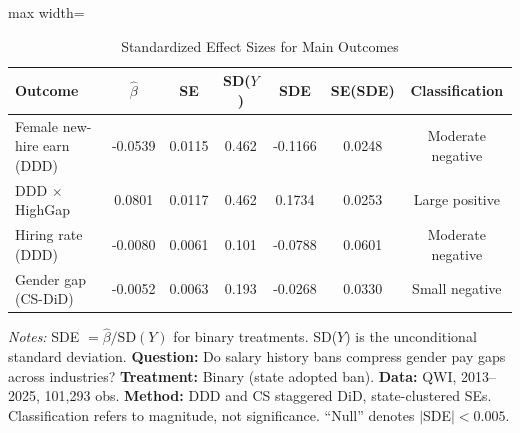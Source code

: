 \begin{table}[H]
\centering
\caption{Standardized Effect Sizes for Main Outcomes}
\label{tab:sde}
\begin{adjustbox}{max width=\textwidth}
\begin{tabular}{lcccccc}
\toprule
Outcome & $\hat{\beta}$ & SE & SD($Y$) & SDE & SE(SDE) & Classification \\
\midrule
Female new-hire earn (DDD) & -0.0539 & 0.0115 & 0.462 & -0.1166 & 0.0248 & Moderate negative \\
DDD $\times$ HighGap & 0.0801 & 0.0117 & 0.462 & 0.1734 & 0.0253 & Large positive \\
Hiring rate (DDD) & -0.0080 & 0.0061 & 0.101 & -0.0788 & 0.0601 & Moderate negative \\
Gender gap (CS-DiD) & -0.0052 & 0.0063 & 0.193 & -0.0268 & 0.0330 & Small negative \\
\bottomrule
\end{tabular}
\end{adjustbox}

\vspace{0.5em}
{\small \emph{Notes:} SDE $= \hat{\beta} / \text{SD}(Y)$ for binary treatments. SD($Y$) is the unconditional standard deviation. \textbf{Question:} Do salary history bans compress gender pay gaps across industries? \textbf{Treatment:} Binary (state adopted ban). \textbf{Data:} QWI, 2013--2025, 101{,}293 obs. \textbf{Method:} DDD and CS staggered DiD, state-clustered SEs. Classification refers to magnitude, not significance. ``Null'' denotes $|$SDE$| < 0.005$.}
\end{table}
